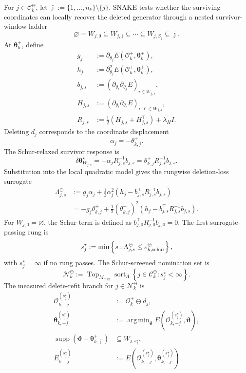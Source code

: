 \documentclass[
  reprint,
  amsmath,
  amssymb,
  aps,
  pra,
  nofootinbib,
  superscriptaddress,
  floatfix
]{revtex4-2}
\newcommand{\argminp}{\mathop{\mathrm{arg\,min}}}
\begin{document}
For \(j\in\mathcal C_k^\ominus\), let \(\bar{\jmath}:=\{1,\ldots,n_k\}\setminus\{j\}\).  SNAKE tests whether the surviving coordinates can locally recover the deleted generator through a nested survivor-window ladder
\[
\varnothing=W_{j,0}
\subseteq W_{j,1}
\subseteq\cdots
\subseteq W_{j,S_j}
\subseteq\bar{\jmath}.
\]
At \(\boldsymbol\theta_k^+\), define
\[
\begin{aligned}
g_j&:=\partial_{\theta_j}E(\mathcal O_k^+,\boldsymbol\theta_k^+),
\\
h_j&:=\partial_{\theta_j}^2E(\mathcal O_k^+,\boldsymbol\theta_k^+),
\\
b_{j,s}
&:=
\left(
\partial_{\theta_i}\partial_{\theta_j}E
\right)_{i\in W_{j,s}},
\\
H_{j,s}
&:=
\left(
\partial_{\theta_i}\partial_{\theta_\ell}E
\right)_{i,\ell\in W_{j,s}},
\\
R_{j,s}
&:=
\frac12(H_{j,s}+H_{j,s}^{\top})+\lambda_H I .
\end{aligned}
\]
Deleting \(d_j\) corresponds to the coordinate displacement
\[
\alpha_j=-\theta_{k,j}^+ .
\]
The Schur-relaxed survivor response is
\[
\delta\boldsymbol\theta_{W_{j,s}}^\star
=
-\alpha_jR_{j,s}^{-1}b_{j,s}
=
\theta_{k,j}^+R_{j,s}^{-1}b_{j,s}.
\]
Substitution into the local quadratic model gives the rungwise deletion-loss surrogate
\[
\begin{aligned}
\Lambda_{j,s}^{\ominus}
&:=
g_j\alpha_j
+\frac12\alpha_j^2
\left(
h_j-b_{j,s}^{\top}R_{j,s}^{-1}b_{j,s}
\right)
\\
&=
-g_j\theta_{k,j}^+
+\frac12(\theta_{k,j}^+)^2
\left(
h_j-b_{j,s}^{\top}R_{j,s}^{-1}b_{j,s}
\right).
\end{aligned}
\]
For \(W_{j,0}=\varnothing\), the Schur term is defined as \(b_{j,0}^{\top}R_{j,0}^{-1}b_{j,0}=0\).  The first surrogate-passing rung is
\[
s_j^\star
:=
\min\left\{
s:
\Lambda_{j,s}^{\ominus}
\le \varepsilon_{k,{\rm schur}}^\ominus
\right\},
\]
with \(s_j^\star=\infty\) if no rung passes.  The Schur-screened nomination set is
\[
\mathcal N_k^\ominus
:=
\operatorname{Top}_{M_{\max}}
\operatorname{sort}_{\Lambda}
\left\{
j\in\mathcal C_k^\ominus:
s_j^\star<\infty
\right\}.
\]
The measured delete-refit branch for \(j\in\mathcal N_k^\ominus\) is
\[
\begin{aligned}
\mathcal O_{k,-j}^{(s_j^\star)}
&:=
\mathcal O_k^+\ominus d_j,
\\
\boldsymbol\theta_{k,-j}^{(s_j^\star)}
&:=
\argminp_{\boldsymbol\vartheta}
E(\mathcal O_{k,-j}^{(s_j^\star)},\boldsymbol\vartheta),
\\
\operatorname{supp}
\left(
\boldsymbol\vartheta-\boldsymbol\theta_{k,\bar{\jmath}}^+
\right)
&\subseteq W_{j,s_j^\star},
\\
E_{k,-j}^{(s_j^\star)}
&:=
E(\mathcal O_{k,-j}^{(s_j^\star)},\boldsymbol\theta_{k,-j}^{(s_j^\star)}).
\end{aligned}
\]
\end{document}
